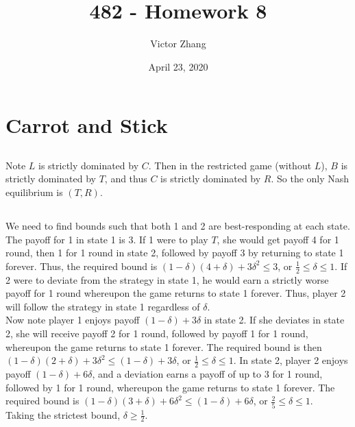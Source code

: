 \documentclass{article}
\title{482 - Homework 8}
\author{Victor Zhang}
\date{April 23, 2020}
\begin{document}
\maketitle

\section{Carrot and Stick}
\subsection{}
Note $L$ is strictly dominated by $C$. Then in the restricted game (without $L$), $B$ is strictly dominated by $T$, and thus $C$ is strictly dominated by $R$. So the only Nash equilibrium is $(T,R)$.
\subsection{}
We need to find bounds such that both 1 and 2 are best-responding at each state. The payoff for 1 in state 1 is 3. If 1 were to play $T$, she would get payoff 4 for 1 round, then 1 for 1 round in state 2, followed by payoff 3 by returning to state 1 forever. Thus, the required bound is $(1-\delta)(4+ \delta) + 3\delta^2 \leq 3$, or $\frac{1}{2} \leq \delta \leq 1$. If 2 were to deviate from the strategy in state 1, he would earn a strictly worse payoff for 1 round whereupon the game returns to state 1 forever. Thus, player 2 will follow the strategy in state 1 regardless of $\delta$.\\
Now note player 1 enjoys payoff $(1-\delta) + 3\delta$ in state 2. If she deviates in state 2, she will receive payoff 2 for 1 round, followed by payoff 1 for 1 round, whereupon the game returns to state 1 forever. The required bound is then $(1-\delta)(2 + \delta) + 3\delta^2 \leq (1-\delta) + 3\delta$, or $\frac{1}{2} \leq \delta \leq 1$. In state 2, player 2 enjoys payoff $(1-\delta) + 6\delta$, and a deviation earns a payoff of up to 3 for 1 round, followed by 1 for 1 round, whereupon the game returns to state 1 forever. The required bound is $(1-\delta)(3 + \delta) + 6\delta^2 \leq (1-\delta) + 6\delta$, or $\frac{2}{5} \leq \delta \leq 1$.\\
Taking the strictest bound, $\delta \geq \frac{1}{2}$.
\end{document}

